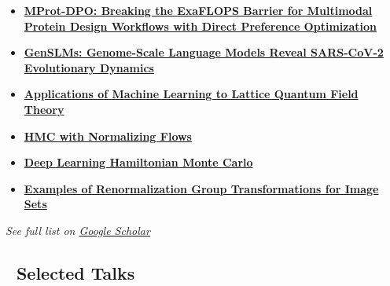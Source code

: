 \documentclass[
  letterpaper,
  DIV=11,
  numbers=noendperiod]{scrartcl}
\providecommand{\tightlist}{%
  \setlength{\itemsep}{0pt}\setlength{\parskip}{0pt}}\usepackage{longtable,booktabs,array}
\begin{document}
\begin{itemize}
\tightlist
\item
  \href{https://www.researchgate.net/publication/387390653_MProt-DPO_Breaking_the_ExaFLOPS_Barrier_for_Multimodal_Protein_Design_Workflows_with_Direct_Preference_Optimization}{\textbf{MProt-DPO:
  Breaking the ExaFLOPS Barrier for Multimodal Protein Design Workflows
  with Direct Preference Optimization}}
\item
  \href{https://doi.org/10.1177/10943420231184990}{\textbf{GenSLMs:
  Genome-Scale Language Models Reveal SARS-CoV-2 Evolutionary Dynamics}}
\item
  \href{https://arxiv.org/abs/2202.05838}{\textbf{Applications of
  Machine Learning to Lattice Quantum Field Theory}}
\item
  \href{https://arxiv.org/abs/2112.01586}{\textbf{HMC with Normalizing
  Flows}}
\item
  \href{https://arxiv.org/abs/2105.03418}{\textbf{Deep Learning
  Hamiltonian Monte Carlo}}
\item
  \href{https://journals.aps.org/pre/abstract/10.1103/PhysRevE.98.052129}{\textbf{Examples
  of Renormalization Group Transformations for Image Sets}}
\end{itemize}

\emph{See full list on
\href{https://scholar.google.com/citations?user=7vBs2ZwAAAAJ}{Google
Scholar}}

\subsection{🎤 Selected Talks}\label{selected-talks}
\end{document}
